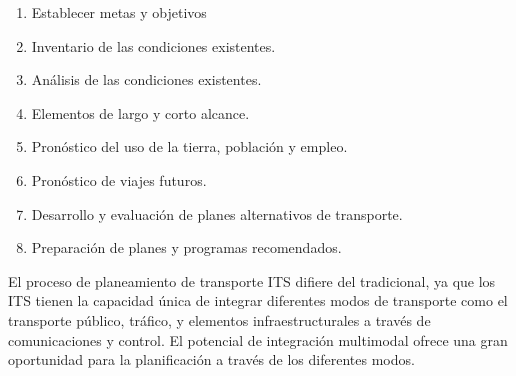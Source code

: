 \begin{enumerate}
\item Establecer metas y objetivos

\item Inventario de las condiciones existentes.

\item Análisis de las condiciones existentes.

\item Elementos de largo y corto alcance.

\item Pronóstico del uso de la tierra, población y empleo.

\item Pronóstico de viajes futuros.

\item Desarrollo y evaluación de planes alternativos de transporte.

\item Preparación de planes y programas recomendados.
\end{enumerate}

El proceso de planeamiento de transporte ITS difiere del tradicional, ya que los ITS tienen la capacidad única de integrar diferentes modos de transporte como el transporte público, tráfico, y elementos infraestructurales a través de comunicaciones y control. El potencial de integración multimodal ofrece una gran oportunidad para la planificación a través de los diferentes modos.
